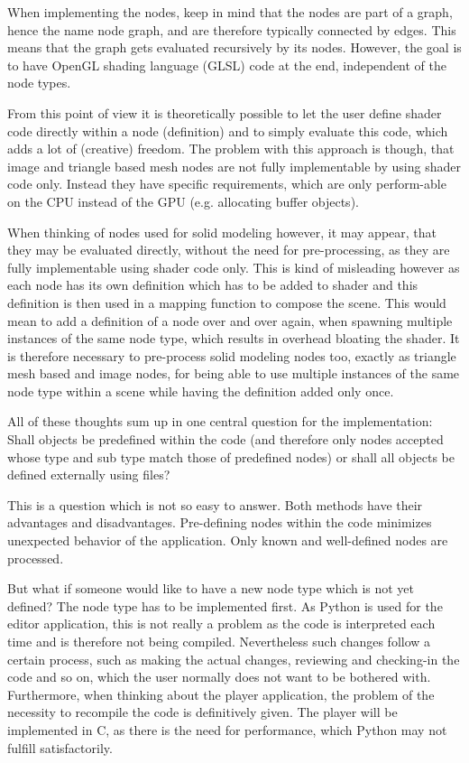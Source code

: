 \documentclass[10pt, openright, notitlepage]{scrreprt}
\begin{document}
When implementing the nodes, keep in mind that the nodes are part of a graph,
hence the name node graph, and are therefore typically connected by edges. This
means that the graph gets evaluated recursively by its nodes. However, the goal
is to have OpenGL shading language (GLSL) code at the end, independent of the
node types.

From this point of view it is theoretically possible to let the user define shader
code directly within a node (definition) and to simply evaluate this code, which
adds a lot of (creative) freedom. The problem with this approach is though, that
image and triangle based mesh nodes are not fully implementable by using shader
code only. Instead they have specific requirements, which are only perform-able
on the CPU instead of the GPU (e.g. allocating buffer objects).

When thinking of nodes used for solid modeling however, it may appear, that they
may be evaluated directly, without the need for pre-processing, as they are
fully implementable using shader code only. This is kind of misleading however
as each node has its own definition which has to be added to shader and this
definition is then used in a mapping function to compose the scene. This would
mean to add a definition of a node over and over again, when spawning multiple
instances of the same node type, which results in overhead bloating the shader.
It is therefore necessary to pre-process solid modeling nodes too, exactly as
triangle mesh based and image nodes, for being able to use multiple instances of
the same node type within a scene while having the definition added only once.

All of these thoughts sum up in one central question for the implementation:
Shall objects be predefined within the code (and therefore only nodes accepted
whose type and sub type match those of predefined nodes) or shall all objects be
defined externally using files?

This is a question which is not so easy to answer. Both methods have their
advantages and disadvantages. Pre-defining nodes within the code minimizes
unexpected behavior of the application. Only known and well-defined nodes are
processed.

But what if someone would like to have a new node type which is not yet defined?
The node type has to be implemented first. As Python is used for the editor
application, this is not really a problem as the code is interpreted each time
and is therefore not being compiled. Nevertheless such changes follow a certain
process, such as making the actual changes, reviewing and checking-in the code
and so on, which the user normally does not want to be bothered with.
Furthermore, when thinking about the player application, the problem of the
necessity to recompile the code is definitively given. The player will be
implemented in C, as there is the need for performance, which Python may not
fulfill satisfactorily.
\end{document}

